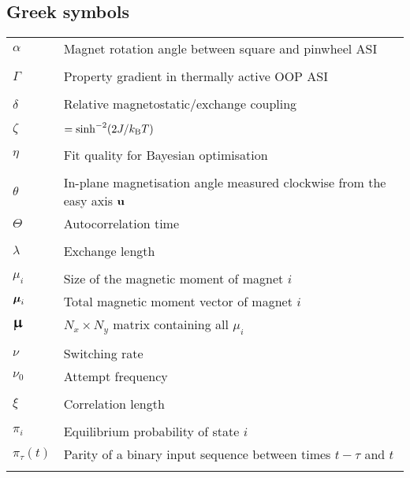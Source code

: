 \subsection*{Greek symbols}
\begin{longtable}[l]{p{60pt} p{350pt}}
	$\alpha$ & Magnet rotation angle between square and pinwheel ASI \\
	&\\
	
	$\Gamma$ & Property gradient in thermally active OOP ASI \\
	&\\

	$\delta$ & Relative magnetostatic/exchange coupling \\
	&\\
	
	$\zeta$ & $=\sinh^{-2}(2J/\kBT)$ \\
	&\\
	
	$\eta$ & Fit quality for Bayesian optimisation \\
	&\\

	$\theta$ & In-plane magnetisation angle measured clockwise from the easy axis $\boldsymbol{\mathbf{u}}$ \\
	$\Theta$ & Autocorrelation time \\
	&\\
	
	$\lambda$ & Exchange length \\
	&\\

	$\mu_i$ & Size of the magnetic moment of magnet $i$ \\
	$\boldsymbol{\mathbf{\mu}}_i$ & Total magnetic moment vector of magnet $i$ \\
	$\vc{\bigmu}$ & $N_x \times N_y$ matrix containing all $\mu_i$ \\
	&\\
	
	$\nu$ & Switching rate \\
	$\nu_0$ & Attempt frequency \\
	&\\
	
	$\xi$ & Correlation length \\
	&\\

	$\pi_i$ & Equilibrium probability of state $i$ \\
	$\pi_\tau(t)$ & Parity of a binary input sequence between times $t-\tau$ and $t$ \\
	&\\


\end{longtable}

